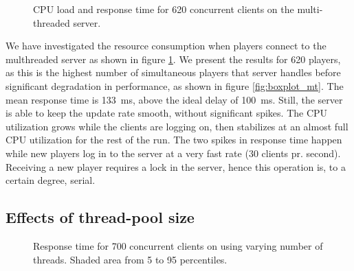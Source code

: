 \begin{figure}
  \centering %
  \caption{CPU load and response time for 620 concurrent clients on
    the multi-threaded server.}
  \label{fig:cpu-load-620}
\end{figure}

We have investigated the resource consumption when players connect to
the multhreaded server as shown in figure \ref{fig:cpu-load-620}. We
present the results for 620 players, as this is the highest number of
simultaneous players that server handles before significant
degradation in performance, as shown in figure
\ref{fig:boxplot_mt}. The mean response time is 133~ms, above the
ideal delay of 100~ms. Still, the server is able to keep the update
rate smooth, without significant spikes. The CPU utilization grows
while the clients are logging on, then stabilizes at an almost full
CPU utilization for the rest of the run. The two spikes in response
time happen while new players log in to the server at a very fast rate
(30 clients pr. second). Receiving a new player requires a lock in the
server, hence this operation is, to a certain degree, serial.

\subsection{Effects of thread-pool size}

\begin{figure}
  \centering 
  \vspace{-3mm}
  \caption{Response time for 700 concurrent clients on using varying number of threads. Shaded area from 5 to 95 percentiles.}
  \vspace{-3mm} 
  \label{fig:line-threads-700}
\end{figure}

